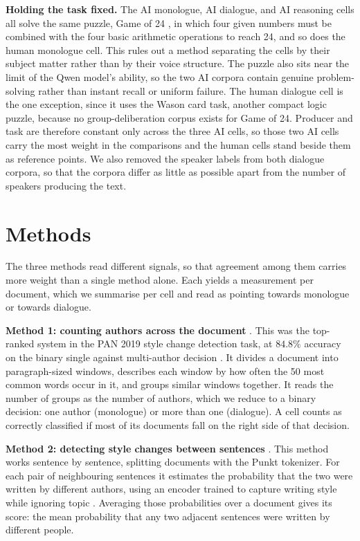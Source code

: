 \documentclass[10pt,twocolumn]{article}
\begin{document}
\textbf{Holding the task fixed.} The AI monologue, AI dialogue, and AI reasoning cells all solve the
same puzzle, Game of 24 \cite{yao2023}, in which four given numbers must be combined with the four
basic arithmetic operations to reach 24, and so does the human monologue cell. This
rules out a method separating the cells by their subject matter rather than by their voice structure.
The puzzle also sits near the limit of the Qwen model's ability, so the two AI corpora contain
genuine problem-solving rather than instant recall or uniform failure. The human dialogue cell is the
one exception, since it uses the Wason card task, another compact logic puzzle, because no
group-deliberation corpus exists for Game of 24. Producer and task are therefore constant only across
the three AI cells, so those two AI cells carry the most weight in the comparisons and the human
cells stand beside them as reference points. We also removed the speaker labels from both dialogue corpora, so that the
corpora differ as little as possible apart from the number of speakers producing the text.

\section{Methods}
The three methods read different signals, so that agreement among them carries more weight than a
single method alone. Each yields a measurement per document, which we summarise per cell and read as
pointing towards monologue or towards dialogue.

\textbf{Method 1: counting authors across the document} \cite{nath2019}. This was the top-ranked
system in the PAN 2019 style change detection task, at $84.8\%$ accuracy on the binary single against
multi-author decision \cite{zangerle2019}. It divides a document into paragraph-sized windows,
describes each window by how often the 50 most common words occur in it, and groups similar windows
together. It reads the number of groups as the number of authors, which we reduce to a binary
decision: one author (monologue) or more than one (dialogue). A cell counts as correctly classified
if most of its documents fall on the right side of that decision.

\textbf{Method 2: detecting style changes between sentences} \cite{schmidt2025}. This method
works sentence by sentence, splitting documents with the Punkt tokenizer. For each pair of
neighbouring sentences it estimates the probability that the two were written by different authors,
using an encoder trained to capture writing style while ignoring topic \cite{patel2025}. Averaging
those probabilities over a document gives its score: the mean probability that any two adjacent
sentences were written by different people.
\end{document}
